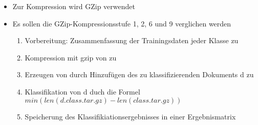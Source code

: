 \begin{frame}[c]
\begin{itemize}
  \item Zur Kompression wird GZip verwendet
  \item Es sollen die GZip-Kompressionsstufe 1, 2, 6 und 9 verglichen werden
  \begin{enumerate}
  \item Vorbereitung: Zusammenfassung der Trainingsdaten jeder Klasse zu
  \item Kompression mit gzip von  zu 
  \item Erzeugen von  durch Hinzufügen des zu
  klassifizierenden Dokuments d zu 
  \item Klassifikation von d duch die Formel
  $min(len(d.class.tar.gz)-len(class.tar.gz))$
  \item Speicherung des Klassifikiationsergebnisses in einer Ergebnismatrix
\end{enumerate}
\end{itemize}
\end{frame}

